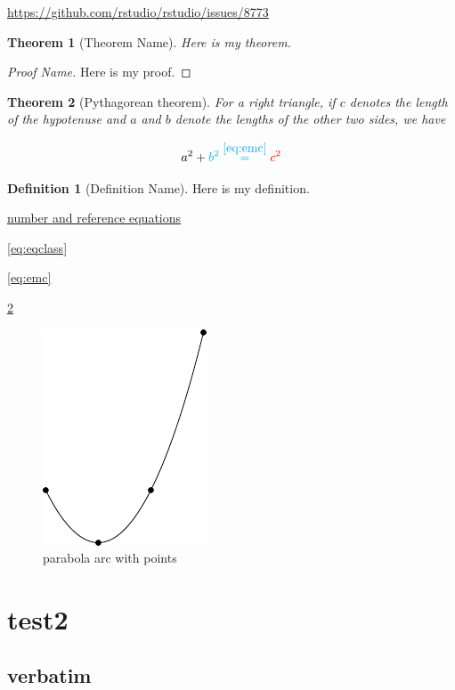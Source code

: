 \documentclass[
]{book}
\newtheorem{theorem}{Theorem}[chapter]
\theoremstyle{definition}
\newtheorem{definition}{Definition}[chapter]
\theoremstyle{definition}
\theoremstyle{definition}
\theoremstyle{definition}
\theoremstyle{remark}
\begin{document}
\url{https://github.com/rstudio/rstudio/issues/8773}

\begin{theorem}[Theorem Name]
\protect\hypertarget{thm:label}{}\label{thm:label}Here is my theorem.
\end{theorem}

\begin{proof}[Proof Name]
Here is my proof.
\end{proof}

\begin{theorem}[Pythagorean theorem]
\protect\hypertarget{thm:pyth}{}\label{thm:pyth}For a right triangle, if \(c\) denotes the length of the hypotenuse
and \(a\) and \(b\) denote the lengths of the other two sides, we have

\[a^2 + \color{cyan}b^2 \overset{\ref{eq:emc}}= \color{red}{c^2} \]
\end{theorem}

\begin{definition}[Definition Name]
\protect\hypertarget{def:unnamed-chunk-22}{}\label{def:unnamed-chunk-22}Here is my definition.
\end{definition}

\protect\hyperlink{number-and-reference-equations}{number and reference equations}

\eqref{eq:eqclass}

\eqref{eq:emc}

\ref{thm:pyth}

\begin{figure}
\includegraphics[width=0.25\linewidth]{202401280001-test_files/figure-latex/parabola-arc-with-points-1} \caption{parabola arc with points}\label{fig:parabola-arc-with-points}
\end{figure}

\hypertarget{test2}{%
\chapter{test2}\label{test2}}

\hypertarget{verbatim}{%
\section{verbatim}\label{verbatim}}
\end{document}
